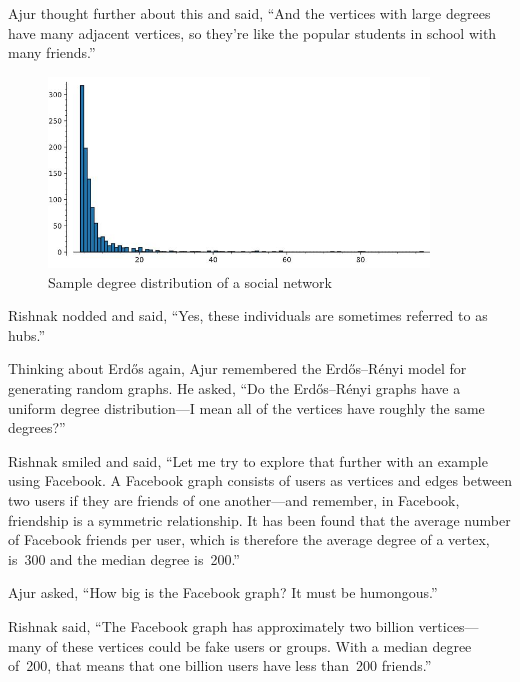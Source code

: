 Ajur thought further about this and said, ``And the vertices with large degrees have many adjacent vertices, so they're like the popular students in school with many friends.''

\begin{figure}
\begin{center}
\includegraphics[width=0.9\textwidth]{degreepowerlawdist.jpg}
\caption{Sample degree distribution of a social network}\label{21p1}
\end{center}

\end{figure}
\begin{newpage}
\end{newpage}
 
Rishnak nodded and said, ``Yes, these individuals are sometimes referred to as hubs.''
 
Thinking about Erd\H{o}s again, Ajur remembered the Erd\H{o}s--R\'enyi model for generating random graphs. He asked, ``Do the Erd\H{o}s--R\'enyi graphs have a uniform degree distribution---I mean all of the vertices have roughly the same degrees?''

Rishnak smiled and said, ``Let me try to explore that further with an example using Facebook. A Facebook graph consists of users as vertices and edges between two users if they are friends of one another---and remember, in Facebook, friendship is a symmetric relationship. It has been found that the average number of Facebook friends per user, which is therefore the average degree of a vertex, is~300 and the median degree is~200.''

Ajur asked, ``How big is the Facebook graph? It must be humongous.''

Rishnak said, ``The Facebook graph has approximately two billion vertices---many of these vertices could be fake users or groups. With a median degree of~200, that means that one billion users have less than~200 friends.''

